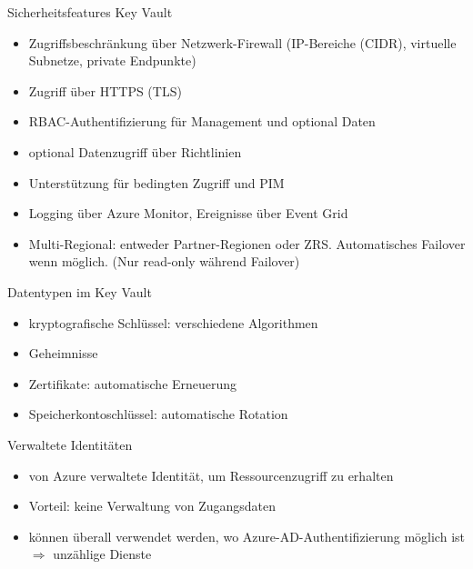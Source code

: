 \begin{flashcard}[Definition]{Sicherheitsfeatures Key Vault}
  \begin{itemize}
    \item Zugriffsbeschränkung über Netzwerk-Firewall\newline
      (IP-Bereiche (CIDR), virtuelle Subnetze, private Endpunkte)
    \item Zugriff über HTTPS (TLS)
    \item RBAC-Authentifizierung für Management und optional Daten
    \item optional Datenzugriff über Richtlinien
    \item Unterstützung für bedingten Zugriff und PIM
    \item Logging über Azure Monitor, Ereignisse über Event Grid
    \item Multi-Regional: entweder Partner-Regionen oder ZRS.\newline
      Automatisches Failover wenn möglich. (Nur read-only während Failover)
  \end{itemize}
\end{flashcard}

\begin{flashcard}[Definition]{Datentypen im Key Vault}
  \begin{itemize}
    \item kryptografische Schlüssel: verschiedene Algorithmen
    \item Geheimnisse
    \item Zertifikate: automatische Erneuerung
    \item Speicherkontoschlüssel: automatische Rotation
  \end{itemize}
\end{flashcard}


\begin{flashcard}[Definition]{Verwaltete Identitäten}
  \begin{itemize}
    \item von Azure verwaltete Identität, um Ressourcenzugriff zu erhalten
    \item Vorteil: keine Verwaltung von Zugangsdaten
    \item können überall verwendet werden, wo Azure-AD-Authentifizierung möglich ist\newline
      $\Rightarrow$ unzählige Dienste
  \end{itemize}
\end{flashcard}

